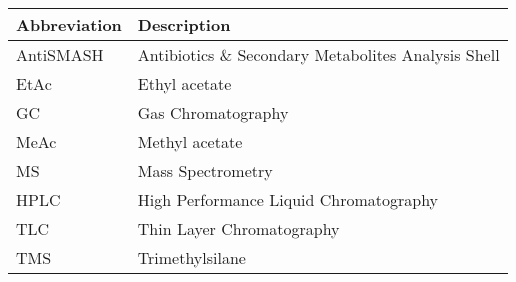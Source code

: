
\begin{table}[htbp]
	\centering
	\begin{tabularx}{\textwidth}{>{\hsize=0.25\hsize}X>{\hsize=0.75\hsize}X}
		\toprule
		\textbf{Abbreviation}		& \textbf{Description}			\\
		\midrule
		AntiSMASH	& Antibiotics \& Secondary Metabolites Analysis Shell	\\
		EtAc		& Ethyl acetate			\\
		GC			& Gas Chromatography	\\
		MeAc		& Methyl acetate		\\
		MS			& Mass Spectrometry		\\
		HPLC		& High Performance Liquid Chromatography		\\
		TLC			& Thin Layer Chromatography 	\\
		TMS 		& Trimethylsilane		\\
		
		
		\bottomrule
	\end{tabularx}
\end{table}
